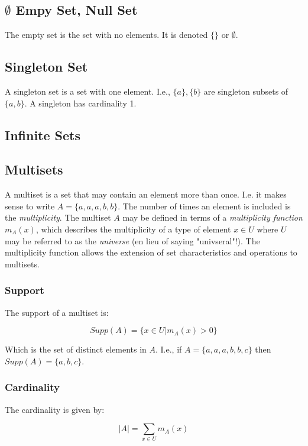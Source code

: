 \subsection{$\emptyset$ Empy Set, Null Set}
The empty set is the set with no elements. It is denoted $\{\}$ or $\emptyset$. 

\subsection{Singleton Set}
A singleton set is a set with one element. I.e., $\{a\}, \{b\}$ are singleton subsets of $\{a,b\}$. A singleton has cardinality 1.

\subsection{Infinite Sets}

\subsection{Multisets}
A multiset is a set that may contain an element more than once. I.e. it makes sense to write $A=\{a,a,a,b,b\}$. The number of times an element is included is the \textit{multiplicity}. The multiset $A$ may be defined in terms of a \textit{multiplicity function} $m_A(x)$, which describes the multiplicity of a type of element $x\in U$ where $U$ may be referred to as the \textit{universe} (en lieu of saying "univseral"!). The multiplicity function allows the extension of set characteristics and operations to multisets.

\subsubsection{Support}
The support of a multiset is:

\begin{equation}
Supp(A) = \{ x\in U | 	m_A(x)>0\}
\end{equation} 

Which is the set of distinct elements in $A$. I.e., if $A = \{a,a,a,b,b,c\}$ then $Supp(A) = \{a,b,c\}$.

\subsubsection{Cardinality}

The cardinality is given by:

\begin{equation}
|A| = \sum_{x\in U} m_A(x)
\end{equation}


